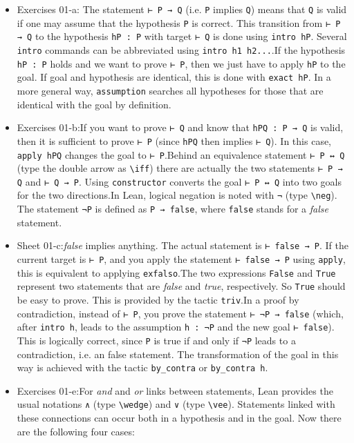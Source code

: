 \documentclass{memoir}
\begin{document}
\begin{itemize}
\item Exercises 01-a:
  The statement \Verb|⊢ P → Q| (i.e. \Verb|P| implies \Verb|Q|) means that \Verb|Q| is valid if one may assume that the hypothesis \Verb|P| is correct. This transition from \Verb|⊢ P → Q| to the hypothesis \Verb|hP : P| with target \Verb|⊢ Q| is done using \Verb|intro hP|. Several \Verb|intro| commands can be abbreviated using \Verb|intro h1 h2...|.If the hypothesis \Verb|hP : P| holds and we want to prove \Verb|⊢ P|, then we just have to apply \Verb|hP| to the goal. If goal and hypothesis are identical, this is done with \Verb|exact hP|. In a more general way, \Verb|assumption| searches all hypotheses for those that are identical with the goal by definition.\item Exercises 01-b:If you want to prove \Verb|⊢ Q| and know that \Verb|hPQ : P → Q| is valid, then it is sufficient to prove \Verb|⊢ P| (since \Verb|hPQ| then implies \Verb|⊢ Q|). In this case, \Verb|apply hPQ| changes the goal to \Verb|⊢ P|.Behind an equivalence statement \Verb|⊢ P ↔ Q| (type the double arrow as \Verb|\iff|) there are actually the two statements \Verb|⊢ P → Q| and \Verb|⊢ Q → P|. Using \Verb|constructor| converts the goal \Verb|⊢ P ↔ Q| into two goals for the two directions.In Lean, logical negation is noted with \Verb|¬| (type \Verb|\neg|). The statement \Verb|¬P| is defined as \Verb|P → false|, where \Verb|false| stands for a \emph{false} statement.\item Sheet 01-c:\emph{false} implies anything. The actual statement is \Verb|⊢ false → P|. If the current target is \Verb|⊢ P|, and you apply the statement \Verb|⊢ false → P| using \Verb|apply|, this is equivalent to applying \Verb|exfalso|.The two expressions \Verb|False| and \Verb|True| represent two statements that are \emph{false} and \emph{true}, respectively. So \Verb|True| should be easy to prove. This is provided by the tactic \Verb|triv|.In a proof by contradiction, instead of \Verb|⊢ P|, you prove the statement \Verb|⊢ ¬P → false| (which, after \Verb|intro h|, leads to the assumption \Verb|h : ¬P| and the new goal \Verb|⊢ false|). This is logically correct, since \Verb|P| is true if and only if \Verb|¬P| leads to a contradiction, i.e. an false statement. The transformation of the goal in this way is achieved with the tactic \Verb|by_contra| or \Verb|by_contra h|.\item Exercises 01-e:For \emph{and} and \emph{or} links between statements, Lean provides the usual notations \Verb|∧| (type \Verb|\wedge|) and \Verb|∨| (type \Verb|\vee|). Statements linked with these connections can occur both in a hypothesis and in the goal. Now there are the following four cases:\begin{itemize}

\end{itemize}
\end{itemize}
\end{document}
